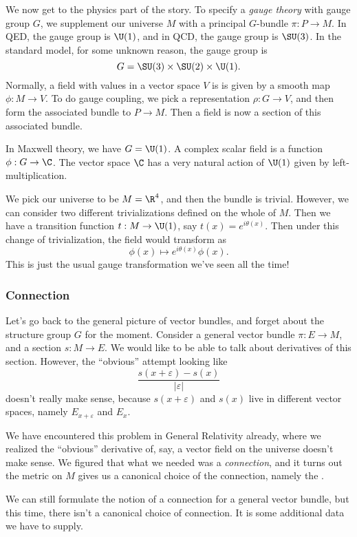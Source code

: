 \documentclass[a4paper]{article}
\begin{document}
We now get to the physics part of the story. To specify a \emph{gauge theory} with gauge group $G$, we supplement our universe $M$ with a principal $G$-bundle $\pi: P \to M$. In QED, the gauge group is $\U(1)$, and in QCD, the gauge group is $\SU(3)$. In the standard model, for some unknown reason, the gauge group is
\[
  G = \SU(3) \times \SU(2) \times \U(1).
\]
Normally, a field with values in a vector space $V$ is is given by a smooth map $\phi: M \to V$. To do gauge coupling, we pick a representation $\rho: G \to V$, and then form the associated bundle to $P \to M$. Then a field is now a section of this associated bundle.

\begin{eg}
  In Maxwell theory, we have $G = \U(1)$. A complex scalar field is a function $\phi: G \to \C$. The vector space $\C$ has a very natural action of $\U(1)$ given by left-multiplication.

  We pick our universe to be $M = \R^4$, and then the bundle is trivial. However, we can consider two different trivializations defined on the whole of $M$. Then we have a transition function $t: M \to \U(1)$, say $t(x) = e^{i \theta(x)}$. Then under this change of trivialization, the field would transform as
  \[
    \phi(x) \mapsto e^{i\theta(x)} \phi(x).
  \]
  This is just the usual gauge transformation we've seen all the time!
\end{eg}

\subsubsection*{Connection}
Let's go back to the general picture of vector bundles, and forget about the structure group $G$ for the moment. Consider a general vector bundle $\pi: E \to M$, and a section $s: M \to E$. We would like to be able to talk about derivatives of this section. However, the ``obvious'' attempt looking like
\[
  \frac{s(x + \varepsilon) - s(x)}{|\varepsilon|}
\]
doesn't really make sense, because $s(x + \varepsilon)$ and $s(x)$ live in different vector spaces, namely $E_{x + \varepsilon}$ and $E_x$.

We have encountered this problem in General Relativity already, where we realized the ``obvious'' derivative of, say, a vector field on the universe doesn't make sense. We figured that what we needed was a \emph{connection}, and it turns out the metric on $M$ gives us a canonical choice of the connection, namely the .

We can still formulate the notion of a connection for a general vector bundle, but this time, there isn't a canonical choice of connection. It is some additional data we have to supply.
\end{document}
